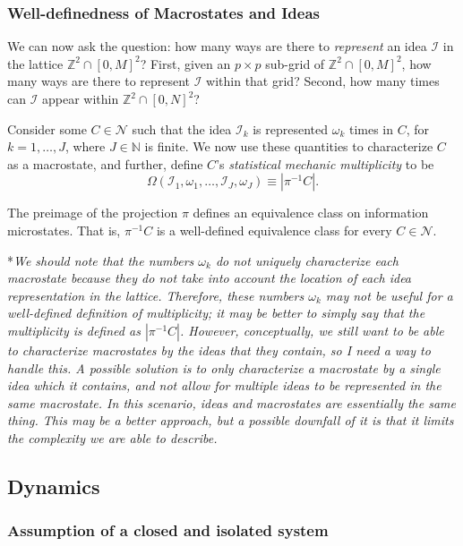 \documentclass{article}
\begin{document}
\subsubsection{Well-definedness of Macrostates and Ideas}

We can now ask the question: how many ways are there to \emph{represent} an idea $\mathcal{I}$ in the lattice $\mathbb{Z}^2\cap[0,M]^2$? First, given an $p\times p$ sub-grid of $\mathbb{Z}^2\cap[0,M]^2$, how many ways are there to represent $\mathcal{I}$ within that grid? Second, how many times can $\mathcal{I}$ appear within $\mathbb{Z}^2\cap[0,N]^2$? 

Consider some $C\in \mathcal{N}$ such that the idea $\mathcal{I}_k$ is represented $\omega_k$ times in $C$, for $k=1,\dots, J$, where $J\in\mathbb{N}$ is finite. We now use these quantities to characterize $C$ as a macrostate, and further, define $C$'s \emph{statistical mechanic multiplicity} to be \[ \Omega(\mathcal{I}_1,\omega_1,\dots,\mathcal{I}_J,\omega_J) \equiv |\pi^{-1}C|. \] 

The preimage of the projection $\pi$ defines an equivalence class on information microstates. That is, $\pi^{-1}C$ is a well-defined equivalence class for every $C\in\mathcal{N}$.

*\emph{We should note that the numbers $\omega_k$ do not uniquely characterize each macrostate because they do not take into account the location of each idea representation in the lattice. Therefore, these numbers $\omega_k$ may not be useful for a well-defined definition of multiplicity; it may be better to simply say that the multiplicity is defined as $|\pi^{-1}C|$. However, conceptually, we still want to be able to characterize macrostates by the ideas that they contain, so I need a way to handle this. A possible solution is to only characterize a macrostate by a single idea which it contains, and not allow for multiple ideas to be represented in the same macrostate. In this scenario, ideas and macrostates are essentially the same thing. This may be a better approach, but a possible downfall of it is that it limits the complexity we are able to describe.}



\subsection{Dynamics}
\subsubsection{Assumption of a closed and isolated system}
\end{document}
